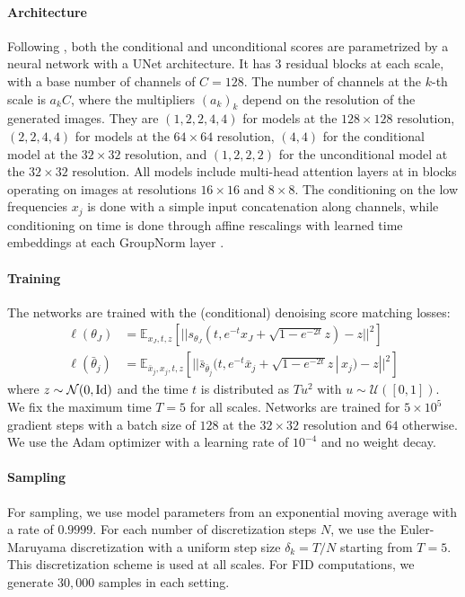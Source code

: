 \documentclass{article}
\begin{document}
\paragraph{Architecture}  Following \cite{nichol2021improved}, both the conditional and unconditional scores are parametrized by a neural network with a UNet architecture. It has $3$ residual blocks at each scale, with a base number of channels of $C = 128$. The number of channels at the $k$-th scale is $a_k C$, where the multipliers $(a_k)_k$ depend on the resolution of the generated images. They are $(1,2,2,4,4)$ for models at the $128 \times 128$ resolution, $(2,2,4,4)$ for models at the $64 \times 64$ resolution, $(4,4)$ for the conditional model at the $32 \times 32$ resolution, and $(1,2,2,2)$ for the unconditional model at the $32 \times 32$ resolution. All models include multi-head attention layers at in blocks operating on images at resolutions $16 \times 16$ and $8 \times 8$. The conditioning on the low frequencies $x_j$ is done with a simple input concatenation along channels, while conditioning on time is done through affine rescalings with learned time embeddings at each GroupNorm layer \citep{nichol2021improved,saharia2021image}.

\paragraph{Training} The networks are trained with the (conditional) denoising score matching losses:
\begin{align}
    \ell(\theta_J) &= \mathbb E_{x_J, t, z}\left[ || s_{\theta_J}(t, e^{-t} x_{J} + \sqrt{1 - e^{-2t}} z) - z  ||^2 \right] \\
    \ell(\bar \theta_j) &= \mathbb E_{\bar x_j, x_j, t, z}\left[ || \bar s_{\bar \theta_j}(t, e^{-t} \bar x_{j} + \sqrt{1 - e^{-2t}} z \,|\, x_j) - z  ||^2 \right]
\end{align}
where $z \sim \mathcal N(0, \operatorname{Id})$ and the time $t$ is distributed as $T u^2$
with $u \sim \mathcal U([0, 1])$. We fix the maximum time $T = 5$ for all
scales. Networks are trained for $5\times{10}^5$ gradient steps with a batch
size of $128$ at the $32 \times 32$ resolution and $64$ otherwise. We use the
Adam optimizer with a learning rate of ${10}^{-4}$ and no weight decay.

\paragraph{Sampling} For sampling, we use model parameters from an exponential moving average with a rate of $0.9999$. For each number of discretization steps $N$, we use the Euler-Maruyama discretization with a uniform step size $\delta_k = T/N$ starting from $T = 5$. This discretization scheme is used at all scales. For FID computations, we generate $30,000$ samples in each setting.

\end{document}
